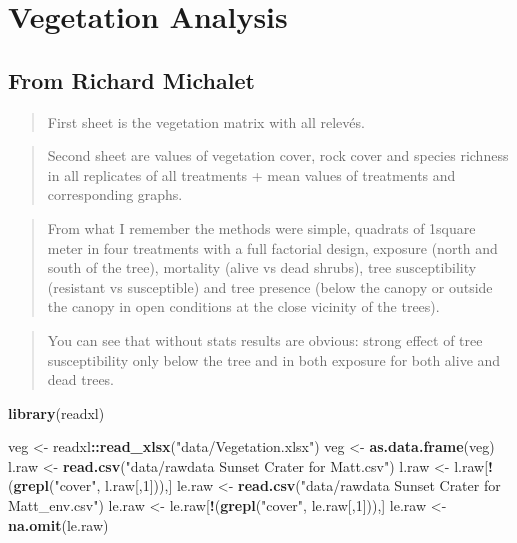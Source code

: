 \documentclass[]{article}
\newenvironment{Shaded}{\begin{snugshade}}{\end{snugshade}}
\newcommand{\KeywordTok}[1]{\textcolor[rgb]{0.13,0.29,0.53}{\textbf{#1}}}
\newcommand{\DecValTok}[1]{\textcolor[rgb]{0.00,0.00,0.81}{#1}}
\newcommand{\StringTok}[1]{\textcolor[rgb]{0.31,0.60,0.02}{#1}}
\newcommand{\OperatorTok}[1]{\textcolor[rgb]{0.81,0.36,0.00}{\textbf{#1}}}
\newcommand{\NormalTok}[1]{#1}
\begin{document}
\section{Vegetation Analysis}\label{vegetation-analysis}

\subsection{From Richard Michalet}\label{from-richard-michalet}

\begin{quote}
First sheet is the vegetation matrix with all relevés.
\end{quote}

\begin{quote}
Second sheet are values of vegetation cover, rock cover and species
richness in all replicates of all treatments + mean values of treatments
and corresponding graphs.
\end{quote}

\begin{quote}
From what I remember the methods were simple, quadrats of 1square meter
in four treatments with a full factorial design, exposure (north and
south of the tree), mortality (alive vs dead shrubs), tree
susceptibility (resistant vs susceptible) and tree presence (below the
canopy or outside the canopy in open conditions at the close vicinity of
the trees).
\end{quote}

\begin{quote}
You can see that without stats results are obvious: strong effect of
tree susceptibility only below the tree and in both exposure for both
alive and dead trees.
\end{quote}

\begin{Shaded}
\begin{Highlighting}[]
\KeywordTok{library}\NormalTok{(readxl)}

\NormalTok{veg <-}\StringTok{ }\NormalTok{readxl}\OperatorTok{::}\KeywordTok{read_xlsx}\NormalTok{(}\StringTok{"data/Vegetation.xlsx"}\NormalTok{)}
\NormalTok{veg <-}\StringTok{ }\KeywordTok{as.data.frame}\NormalTok{(veg)}
\NormalTok{l.raw <-}\StringTok{ }\KeywordTok{read.csv}\NormalTok{(}\StringTok{"data/rawdata Sunset Crater for Matt.csv"}\NormalTok{)}
\NormalTok{l.raw <-}\StringTok{ }\NormalTok{l.raw[}\OperatorTok{!}\NormalTok{(}\KeywordTok{grepl}\NormalTok{(}\StringTok{"cover"}\NormalTok{, l.raw[,}\DecValTok{1}\NormalTok{])),]}
\NormalTok{le.raw <-}\StringTok{ }\KeywordTok{read.csv}\NormalTok{(}\StringTok{"data/rawdata Sunset Crater for Matt_env.csv"}\NormalTok{)}
\NormalTok{le.raw <-}\StringTok{ }\NormalTok{le.raw[}\OperatorTok{!}\NormalTok{(}\KeywordTok{grepl}\NormalTok{(}\StringTok{"cover"}\NormalTok{, le.raw[,}\DecValTok{1}\NormalTok{])),]}
\NormalTok{le.raw <-}\StringTok{ }\KeywordTok{na.omit}\NormalTok{(le.raw)}
\end{Highlighting}
\end{Shaded}
\end{document}
